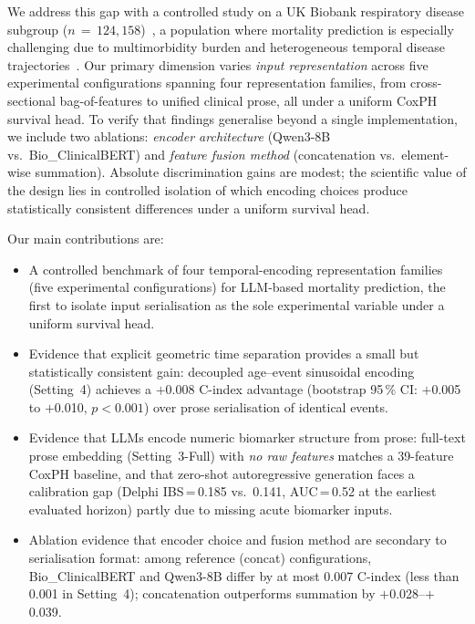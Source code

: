 We address this gap with a controlled study on a UK Biobank respiratory
disease subgroup ($n\,=\,124{,}158$)~\cite{cao2025respiratoryburden,cao2026copd},
a population where mortality prediction is especially challenging due to
multimorbidity burden and heterogeneous temporal disease trajectories~\cite{ukbmdrmf}.
Our primary dimension varies \emph{input representation} across five
experimental configurations spanning four representation families, from
cross-sectional bag-of-features to unified clinical prose, all under a
uniform CoxPH survival head.
To verify that findings generalise beyond a single implementation, we include
two ablations: \emph{encoder architecture} (Qwen3-8B vs.\ Bio\_ClinicalBERT)
and \emph{feature fusion method} (concatenation vs.\ element-wise summation).
Absolute discrimination gains are modest; the scientific value of the design
lies in controlled isolation of which encoding choices produce statistically
consistent differences under a uniform survival head.

Our main contributions are:
\begin{itemize}
  \item A controlled benchmark of four temporal-encoding representation
        families (five experimental configurations) for LLM-based mortality
        prediction, the first to isolate input serialisation as the sole
        experimental variable under a uniform survival head.

  \item Evidence that explicit geometric time separation provides a small
        but statistically consistent gain: decoupled age--event sinusoidal
        encoding (Setting~4) achieves a $+$0.008 C-index advantage (bootstrap
        95\,\% CI: $+$0.005 to $+$0.010, $p<0.001$) over prose serialisation
        of identical events.

  \item Evidence that LLMs encode numeric biomarker structure from prose:
        full-text prose embedding (Setting~3-Full) with \emph{no raw features}
        matches a 39-feature CoxPH baseline, and that zero-shot autoregressive
        generation faces a calibration gap (Delphi IBS\,=\,0.185 vs.\ 0.141,
        AUC\,=\,0.52 at the earliest evaluated horizon) partly due to missing
        acute biomarker inputs.

  \item Ablation evidence that encoder choice and fusion method are
        secondary to serialisation format: among reference (concat)
        configurations, Bio\_ClinicalBERT and Qwen3-8B differ by at most
        0.007 C-index (less than 0.001 in Setting~4); concatenation
        outperforms summation by $+$0.028--$+$0.039.
\end{itemize}
